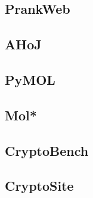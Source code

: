 \subsection{PrankWeb}
\label{sec:prankweb}

\subsection{AHoJ}
\label{sec:ahoj}

\subsection{PyMOL}
\label{sec:pymol}

\subsection{Mol*}
\label{sec:molstar}

\subsection{CryptoBench}
\label{sec:cryptobench}

\subsection{CryptoSite}
\label{sec:cryptosite}

